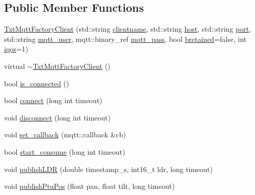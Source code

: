 \subsection*{Public Member Functions}
\begin{DoxyCompactItemize}
\item 
\hyperlink{classft_1_1_txt_mqtt_factory_client_a31996ffdaa56d4faf1e4e3af3ff13579}{Txt\+Mqtt\+Factory\+Client} (std\+::string \hyperlink{classft_1_1_txt_mqtt_factory_client_a22be9e9d3b627a159aced6ae6bdffcc2}{clientname}, std\+::string \hyperlink{classft_1_1_txt_mqtt_factory_client_aa927ee53f42359598d014b334c064d83}{host}, std\+::string \hyperlink{classft_1_1_txt_mqtt_factory_client_af60c5887f1eae5dc4039fa284eb2b0b6}{port}, std\+::string \hyperlink{classft_1_1_txt_mqtt_factory_client_ab4c4b9312d3df970892ae26c143eb5ff}{mqtt\+\_\+user}, mqtt\+::binary\+\_\+ref \hyperlink{classft_1_1_txt_mqtt_factory_client_abb1d5f2fd93c87710ad4ea57d3d6702b}{mqtt\+\_\+pass}, bool \hyperlink{classft_1_1_txt_mqtt_factory_client_a057a4b3e05359993f4e591dfac65e56a}{bretained}=false, int \hyperlink{classft_1_1_txt_mqtt_factory_client_a63fa34c118f67674e0afb96ca3af1408}{iqos}=1)
\item 
virtual \hyperlink{classft_1_1_txt_mqtt_factory_client_a819f30cbefa3ddd5547e8c88aa78dde3}{$\sim$\+Txt\+Mqtt\+Factory\+Client} ()
\item 
bool \hyperlink{classft_1_1_txt_mqtt_factory_client_ac63f2c42da427fb8d2607f861981fcc1}{is\+\_\+connected} ()
\item 
bool \hyperlink{classft_1_1_txt_mqtt_factory_client_aa0626009466c14b2f7c3b2da276a3c87}{connect} (long int timeout)
\item 
void \hyperlink{classft_1_1_txt_mqtt_factory_client_a7e77bcf793eaee53762244b21b9b4b97}{disconnect} (long int timeout)
\item 
void \hyperlink{classft_1_1_txt_mqtt_factory_client_af31825b5b21a4bab5742eb59407305e7}{set\+\_\+callback} (mqtt\+::callback \&cb)
\item 
bool \hyperlink{classft_1_1_txt_mqtt_factory_client_a6501429911b63950cea973b001f24cf8}{start\+\_\+consume} (long int timeout)
\item 
void \hyperlink{classft_1_1_txt_mqtt_factory_client_ac56473bd135be28aac2caeeff0dd06eb}{publish\+L\+DR} (double timestamp\+\_\+s, int16\+\_\+t ldr, long timeout)
\item 
void \hyperlink{classft_1_1_txt_mqtt_factory_client_ad58fa45acba2c4b7ee208a4efdbf2140}{publish\+Ptu\+Pos} (float pan, float tilt, long timeout)
\item 

\end{DoxyCompactItemize}

